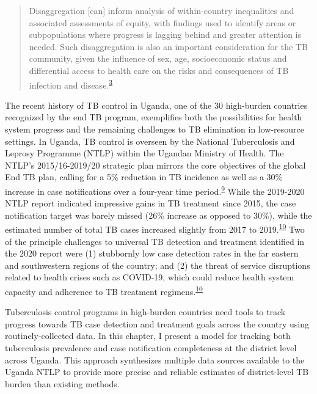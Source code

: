 \documentclass[
]{article}
\begin{document}
\begin{quote}
Disaggregation {[}can{]} inform analysis of within-country inequalities and associated assessments of equity, with findings used to identify areas or subpopulations where progress is lagging behind and greater attention is needed. Such disaggregation is also an important consideration for the TB community, given the influence of sex, age, socioeconomic status and differential access to health care on the risks and consequences of TB infection and disease.\textsuperscript{\protect\hyperlink{ref-WorldHealthOrganization2019}{3}}
\end{quote}

The recent history of TB control in Uganda, one of the 30 high-burden countries recognized by the end TB program, exemplifies both the possibilities for health system progress and the remaining challenges to TB elimination in low-resource settings. In Uganda, TB control is overseen by the National Tuberculosis and Leprosy Programme (NTLP) within the Ugandan Ministry of Health. The NTLP's 2015/16-2019/20 strategic plan mirrors the core objectives of the global End TB plan, calling for a 5\% reduction in TB incidence as well as a 30\% increase in case notifications over a four-year time period.\textsuperscript{\protect\hyperlink{ref-UgandaNationalTuberculosisandLeprosyProgramme2017a}{9}} While the 2019-2020 NTLP report indicated impressive gains in TB treatment since 2015, the case notification target was barely missed (26\% increase as opposed to 30\%), while the estimated number of total TB cases increased slightly from 2017 to 2019.\textsuperscript{\protect\hyperlink{ref-UgandaNationalTuberculosisandLeprosyProgramme2020}{10}} Two of the principle challenges to universal TB detection and treatment identified in the 2020 report were (1) stubbornly low case detection rates in the far eastern and southwestern regions of the country; and (2) the threat of service disruptions related to health crises such as COVID-19, which could reduce health system capacity and adherence to TB treatment regimens.\textsuperscript{\protect\hyperlink{ref-UgandaNationalTuberculosisandLeprosyProgramme2020}{10}}

Tuberculosis control programs in high-burden countries need tools to track progress towards TB case detection and treatment goals across the country using routinely-collected data. In this chapter, I present a model for tracking both tuberculosis prevalence and case notification completeness at the district level across Uganda. This approach synthesizes multiple data sources available to the Uganda NTLP to provide more precise and reliable estimates of district-level TB burden than existing methods.
\end{document}
